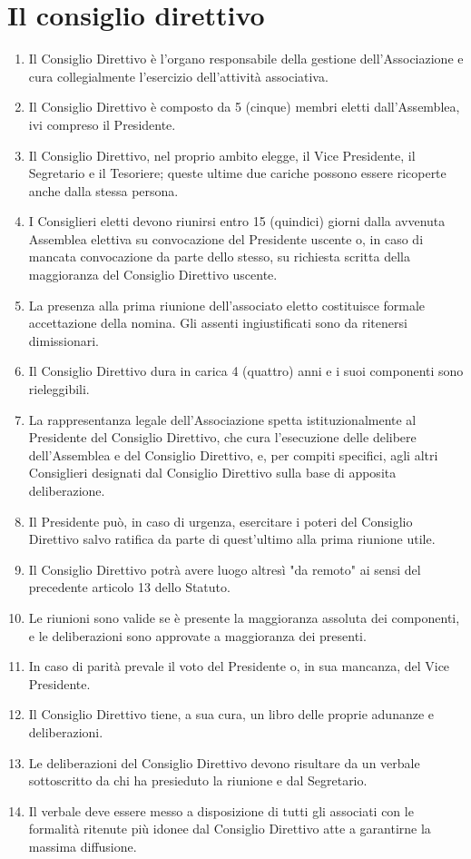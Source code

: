 \documentclass{djtsasddoc}
\begin{document}
	\section{Il consiglio direttivo}
	\begin{enumerate}
		\item Il Consiglio Direttivo è l'organo responsabile della gestione dell'Associazione e cura collegialmente l'esercizio dell'attività associativa.
		\item Il Consiglio Direttivo è composto da 5 (cinque) membri eletti dall'Assemblea, ivi compreso il Presidente.
		\item Il Consiglio Direttivo, nel proprio ambito elegge, il Vice Presidente, il Segretario e il Tesoriere; queste ultime due cariche possono essere ricoperte anche dalla stessa persona.
		\item I Consiglieri eletti devono riunirsi entro 15 (quindici) giorni dalla avvenuta Assemblea elettiva su convocazione del Presidente uscente o, in caso di mancata convocazione da parte dello stesso, su richiesta scritta della maggioranza del Consiglio Direttivo uscente.
		\item La presenza alla prima riunione dell'associato eletto costituisce formale accettazione della nomina. Gli assenti ingiustificati sono da ritenersi dimissionari.
		\item Il Consiglio Direttivo dura in carica 4 (quattro) anni e i suoi componenti sono rieleggibili.
		\item La rappresentanza legale dell'Associazione spetta istituzionalmente al Presidente del Consiglio Direttivo, che cura l'esecuzione delle delibere  dell'Assemblea e del Consiglio Direttivo, e, per compiti specifici, agli altri Consiglieri designati dal Consiglio Direttivo sulla base di apposita deliberazione.
		\item Il Presidente può, in caso di urgenza, esercitare i poteri del Consiglio Direttivo salvo ratifica da parte di quest'ultimo alla prima riunione utile.
		\item Il Consiglio Direttivo potrà avere luogo altresì "da remoto" ai sensi del precedente articolo 13 dello Statuto.
		\item Le riunioni sono valide se è presente la maggioranza assoluta dei componenti, e le deliberazioni sono approvate a maggioranza dei presenti.
		\item In caso di parità prevale il voto del Presidente o, in sua mancanza, del Vice Presidente.
		\item Il Consiglio Direttivo tiene, a sua cura, un libro delle proprie adunanze e deliberazioni.
		\item Le deliberazioni del Consiglio Direttivo devono risultare da un verbale sottoscritto da chi ha presieduto la riunione e dal Segretario.
		\item Il verbale deve essere messo a disposizione di tutti gli associati con le formalità ritenute più idonee dal Consiglio Direttivo atte a garantirne la massima diffusione.
	\end{enumerate}
	
\end{document}
